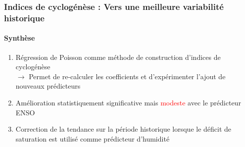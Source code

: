 \documentclass[aspectratio=169, usepdftitle=false, xcolor={dvipsnames}, 9pt,table]{beamer}
\begin{document}
\begin{frame}[c]
    \frametitle{Indices de cyclogénèse : Vers une meilleure variabilité historique}
    \framesubtitle{Synthèse}
    \begin{block}[Synthèse]
        \small
        \begin{enumerate}
            \setlength\itemsep{1.5em}
            \item<1-> \alert{Régression de Poisson} comme méthode  de construction d'indices de cyclogénèse\\
                \vspace{0.8ex}
                $\longrightarrow$ Permet de re-calculer les coefficients et d'expérimenter l'ajout de nouveaux prédicteurs
            \item<2-> Amélioration statistiquement \alert{significative} mais \textcolor{red}{modeste} avec le prédicteur ENSO 
            \item<3-> \alert{Correction} de la tendance sur la période historique lorsque le déficit de saturation est utilisé comme prédicteur d'humidité
        \end{enumerate}
    \end{block}
\end{frame}

\end{document}
